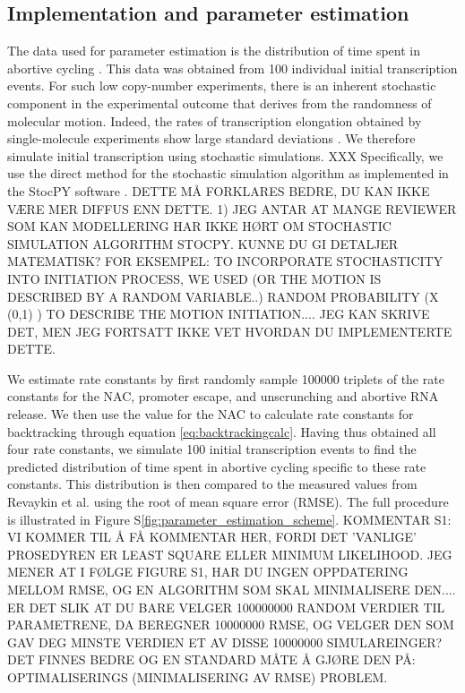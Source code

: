 \subsection{Implementation and parameter estimation}
The data used for parameter estimation is the distribution of time spent in
abortive cycling \cite{revyakin_abortive_2006}. This data was obtained from
100 individual initial transcription events. For such low copy-number
experiments, there is an inherent stochastic component in the experimental
outcome that derives from the randomness of molecular motion. Indeed, the
rates of transcription elongation obtained by single-molecule experiments show
large standard deviations \cite{adelman_single_2002,
tolic-norrelykke_diversity_2004}. We therefore simulate initial transcription
using stochastic simulations. XXX Specifically, we use the direct method for the
stochastic simulation algorithm \cite{gillespie_exact_1977} as implemented in
the StocPY software \cite{maarleveld_stochpy:_2013}. DETTE MÅ FORKLARES BEDRE, DU KAN IKKE VÆRE MER DIFFUS ENN DETTE. 1) JEG ANTAR AT MANGE REVIEWER SOM KAN MODELLERING HAR IKKE HØRT OM STOCHASTIC SIMULATION ALGORITHM STOCPY. KUNNE DU GI DETALJER MATEMATISK? FOR EKSEMPEL: TO INCORPORATE STOCHASTICITY INTO INITIATION PROCESS, WE USED (OR THE MOTION IS DESCRIBED BY A RANDOM VARIABLE..) RANDOM PROBABILITY (X\tilde {} (0,1) ) TO DESCRIBE THE MOTION INITIATION.... JEG KAN SKRIVE DET, MEN JEG FORTSATT IKKE VET HVORDAN DU IMPLEMENTERTE DETTE. 

We estimate rate constants by first randomly sample 100000 triplets of the
rate constants for the NAC, promoter escape, and unscrunching and abortive RNA
release. We then use the value for the NAC to calculate rate constants for
backtracking through equation \eqref{eq:backtrackingcalc}. Having thus obtained
all four rate constants, we simulate 100 initial transcription events to find the
predicted distribution of time spent in abortive cycling specific to these
rate constants. This distribution is then compared to the measured values from
Revaykin et al. \cite{revyakin_abortive_2006} using the root of mean square error (RMSE). The full procedure is illustrated in Figure
S\ref{fig:parameter_estimation_scheme}. %
KOMMENTAR S1: 
VI KOMMER TIL Å FÅ KOMMENTAR HER, FORDI DET 'VANLIGE' PROSEDYREN ER LEAST SQUARE ELLER MINIMUM LIKELIHOOD. JEG MENER AT I FØLGE FIGURE S1, HAR DU INGEN OPPDATERING MELLOM RMSE, OG EN ALGORITHM SOM SKAL MINIMALISERE DEN.... ER DET SLIK AT DU BARE VELGER 100000000 RANDOM VERDIER TIL PARAMETRENE, DA BEREGNER 10000000 RMSE, OG VELGER DEN SOM GAV DEG MINSTE VERDIEN ET AV DISSE 10000000 SIMULAREINGER? DET FINNES BEDRE OG EN STANDARD MÅTE Å GJØRE DEN PÅ: OPTIMALISERINGS (MINIMALISERING AV RMSE) PROBLEM.  


